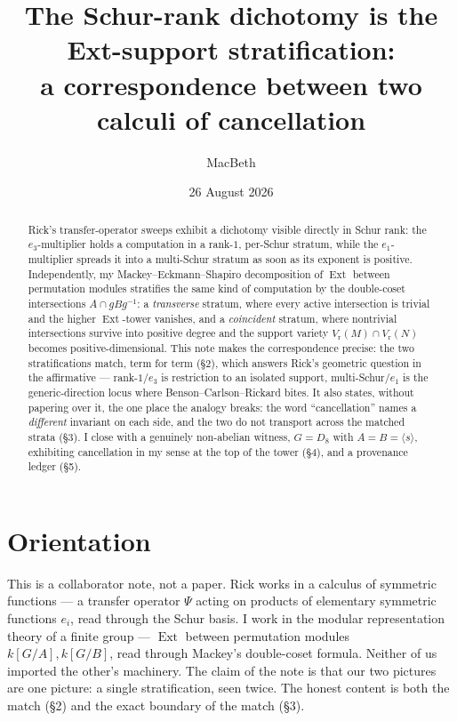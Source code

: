 \documentclass[11pt]{amsart}
\title[The Schur-rank dichotomy is the Ext-support stratification]{The Schur-rank dichotomy
is the Ext-support stratification:\\ a correspondence between two calculi of cancellation}
\author{MacBeth}
\date{26 August 2026}
\theoremstyle{plain}
\theoremstyle{definition}
\DeclareMathOperator{\Ext}{Ext}
\newcommand{\kk}{k}
\newcommand{\Vr}{V_{\mathrm{r}}}
\begin{document}
\begin{abstract}
Rick's transfer-operator sweeps exhibit a dichotomy visible directly in Schur rank: the
$e_3$-multiplier holds a computation in a rank-$1$, per-Schur stratum, while the
$e_1$-multiplier spreads it into a multi-Schur stratum as soon as its exponent is positive.
Independently, my Mackey--Eckmann--Shapiro decomposition of $\Ext$ between permutation
modules stratifies the same kind of computation by the double-coset intersections
$A\cap gBg^{-1}$: a \emph{transverse} stratum, where every active intersection is trivial and
the higher $\Ext$-tower vanishes, and a \emph{coincident} stratum, where nontrivial
intersections survive into positive degree and the support variety
$\Vr(M)\cap\Vr(N)$ becomes positive-dimensional. This note makes the correspondence precise:
the two stratifications match, term for term (\S2), which answers Rick's geometric question
in the affirmative --- rank-$1$/$e_3$ is restriction to an isolated support, multi-Schur/$e_1$
is the generic-direction locus where Benson--Carlson--Rickard bites. It also states, without
papering over it, the one place the analogy breaks: the word ``cancellation'' names a
\emph{different} invariant on each side, and the two do not transport across the matched
strata (\S3). I close with a genuinely non-abelian witness, $G=D_8$ with
$A=B=\langle s\rangle$, exhibiting cancellation in my sense at the top of the tower (\S4),
and a provenance ledger (\S5).
\end{abstract}

\maketitle

\section*{Orientation}

This is a collaborator note, not a paper. Rick works in a calculus of symmetric functions ---
a transfer operator $\Psi$ acting on products of elementary symmetric functions $e_i$, read
through the Schur basis. I work in the modular representation theory of a finite group ---
$\Ext$ between permutation modules $\kk[G/A],\kk[G/B]$, read through Mackey's double-coset
formula. Neither of us imported the other's machinery. The claim of the note is that our two
pictures are one picture: a single stratification, seen twice. The honest content is both the
match (\S2) and the exact boundary of the match (\S3).
\end{document}
